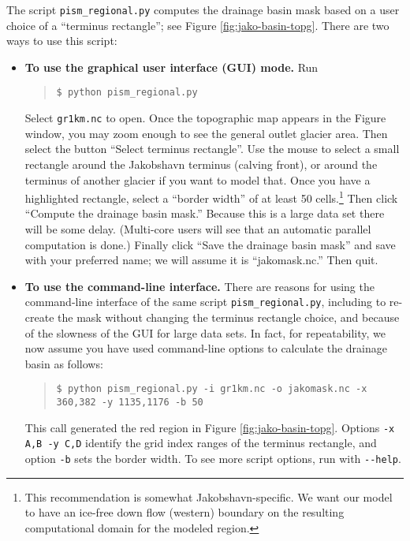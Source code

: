 The script \texttt{pism_regional.py} computes the drainage basin mask based on a user choice of a ``terminus rectangle''; see Figure \ref{fig:jako-basin-topg}.  There are two ways to use this script:
\begin{itemize}
\item \textbf{To use the graphical user interface (GUI) mode.}  Run
\begin{quote}\small
\begin{verbatim}
$ python pism_regional.py
\end{verbatim}
\normalsize\end{quote}
Select \texttt{gr1km.nc} to open.  Once the topographic map appears in the Figure window, you may zoom enough to see the general outlet glacier area.  Then select the button ``Select terminus rectangle''.  Use the mouse to select a small rectangle around the Jakobshavn terminus (calving front), or around the terminus of another glacier if you want to model that.  Once you have a highlighted rectangle, select a ``border width'' of at least 50 cells.\footnote{This recommendation is somewhat Jakobshavn-specific. We want our model to have an ice-free down flow (western) boundary on the resulting computational domain for the modeled region.}  Then click ``Compute the drainage basin mask.''  Because this is a large data set there will be some delay. (Multi-core users will see that an automatic parallel computation is done.)  Finally click ``Save the drainage basin mask'' and save with your preferred name; we will assume it is ``jakomask.nc.''  Then quit.
\item \textbf{To use the command-line interface.}  There are reasons for using the command-line interface of the same script \texttt{pism_regional.py}, including to re-create the mask without changing the terminus rectangle choice, and because of the slowness of the GUI for large data sets.  In fact, for repeatability, we now assume you have used command-line options to calculate the drainage basin as follows:
\begin{quote}\small
\begin{verbatim}
$ python pism_regional.py -i gr1km.nc -o jakomask.nc -x 360,382 -y 1135,1176 -b 50
\end{verbatim}
\normalsize\end{quote}
This call generated the red region in Figure \ref{fig:jako-basin-topg}.  Options \verb|-x A,B -y C,D| identify the grid index ranges of the terminus rectangle, and option \verb|-b| sets the border width.  To see more script options, run with \verb|--help|.
\end{itemize}

